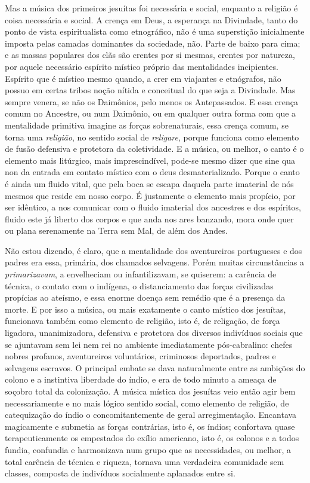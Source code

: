 Mas a música dos primeiros jesuítas foi necessária e social, enquanto a
religião é coisa necessária e social. A crença em Deus, a esperança na
Divindade, tanto do ponto de vista espiritualista como etnográfico, não
é uma superstição inicialmente imposta pelas camadas dominantes da
sociedade, não. Parte de baixo para cima; e as massas populares dos clãs
são crentes por si mesmas, crentes por natureza, por aquele necessário
espírito místico próprio das mentalidades incipientes. Espírito que é
místico mesmo quando, a crer em viajantes e etnógrafos, não possuo em
certas tribos noção nítida e conceitual do que seja a Divindade. Mas
sempre venera, se não os Daimônios, pelo menos os Antepassados. E essa
crença comum no Ancestre, ou num Daimônio, ou em qualquer outra forma
com que a mentalidade primitiva imagine as forças sobrenaturais, essa
crença comum, se torna uma \textit{religião}, no sentido social de \textit{religare},
porque funciona como elemento de fusão defensiva e protetora da
coletividade. E a música, ou melhor, o canto é o elemento mais
litúrgico, mais imprescindível, pode-se mesmo dizer que sine qua non da
entrada em contato místico com o deus desmaterializado. Porque o canto é
ainda um fluido vital, que pela boca se escapa daquela parte imaterial
de nós mesmos que reside em nosso corpo. É justamente o elemento mais
propício, por ser idêntico, a nos comunicar com o fluido imaterial dos
ancestres e dos espíritos, fluido este já liberto dos corpos e que anda
nos ares banzando, mora onde quer ou plana serenamente na Terra sem Mal,
de além dos Andes.

Não estou dizendo, é claro, que a mentalidade dos aventureiros
portugueses e dos padres era essa, primária, dos chamados selvagens.
Porém muitas circunstâncias a \textit{primarizavam}, a envelheciam ou
infantilizavam, se quiserem: a carência de técnica, o contato com o
indígena, o distanciamento das forças civilizadas propícias ao ateísmo,
e essa enorme doença sem remédio que é a presença da morte. E por isso a
música, ou mais exatamente o canto místico dos jesuítas, funcionava
também como elemento de religião, isto é, de religação, de força
ligadora, unanimizadora, defensiva e protetora dos diversos indivíduos
sociais que se ajuntavam sem lei nem rei no ambiente imediatamente
pós-cabralino: chefes nobres profanos, aventureiros voluntários,
criminosos deportados, padres e selvagens escravos. O principal embate
se dava naturalmente entre as ambições do colono e a instintiva
liberdade do índio, e era de todo minuto a ameaça de soçobro total da
colonização. A música mística dos jesuítas veio então agir bem
necessariamente e no mais lógico sentido social, como elemento de
religião, de catequização do índio o concomitantemente de geral
arregimentação. Encantava magicamente e submetia as forças contrárias,
isto é, os índios; confortava quase terapeuticamente os empestados do
exílio americano, isto é, os colonos e a todos fundia, confundia e
harmonizava num grupo que as necessidades, ou melhor, a total carência
de técnica e riqueza, tornava uma verdadeira comunidade sem classes,
composta de indivíduos socialmente aplanados entre si.

